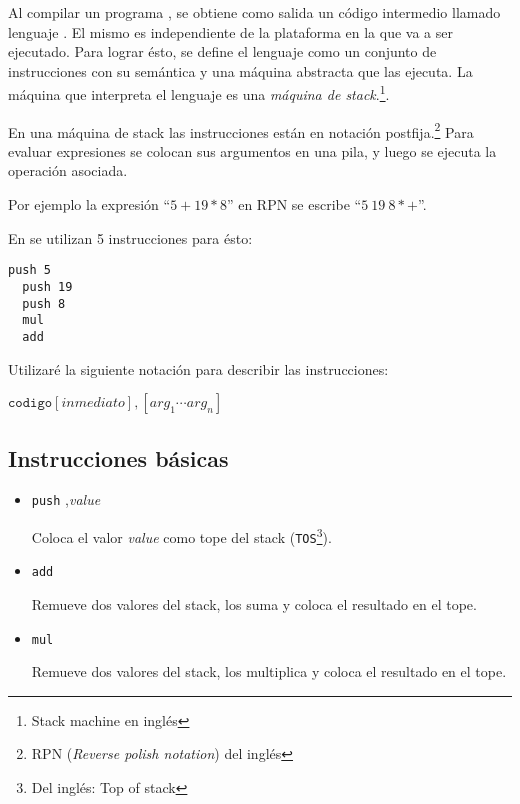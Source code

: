  Al compilar un programa \frob{}, se obtiene como salida un código
intermedio llamado lenguaje \alf{}.
  El mismo es independiente de la plataforma en la que va a ser ejecutado.
  Para lograr ésto, se define el lenguaje como un conjunto de instrucciones
con su semántica y una máquina abstracta que las ejecuta.
La máquina que interpreta el lenguaje \alf{} es una
\textit{máquina de stack}.\footnote{Stack machine en inglés}.

  En una máquina de stack las instrucciones están en notación
  postfija.\footnote{RPN (\textit{Reverse polish notation}) del inglés}
  Para evaluar expresiones se colocan sus argumentos en una pila, y luego
se ejecuta la operación asociada.
  
  Por ejemplo la expresión ``$5 + 19 * 8$'' en RPN se
  escribe ``$5\ 19\ 8 * +$''.
  
  En \alf{} se utilizan 5 instrucciones para ésto:

  \begin{Verbatim}[frame=single]
  push 5
  push 19
  push 8
  mul
  add
  \end{Verbatim}
  
  Utilizaré la siguiente notación para describir las instrucciones:
  \begin{center}
    $\texttt{codigo}  [\textit{inmediato}],  [ {arg}_1 \dotsb {arg}_n ]$
  \end{center}

\subsection{Instrucciones básicas}

\begin{itemize}

\item {
    \texttt{push} ,\textit{value}

    Coloca el valor \textit{value} como tope del stack (\texttt{TOS}\footnote{Del inglés: Top
    of stack}).

    
}
\item {
    \texttt{add}

      Remueve dos valores del stack, los suma y coloca el resultado en
    el tope.

    
}
\item {
    \texttt{mul}

      Remueve dos valores del stack, los multiplica y coloca el resultado en
    el tope.

    
}
\end{itemize}

